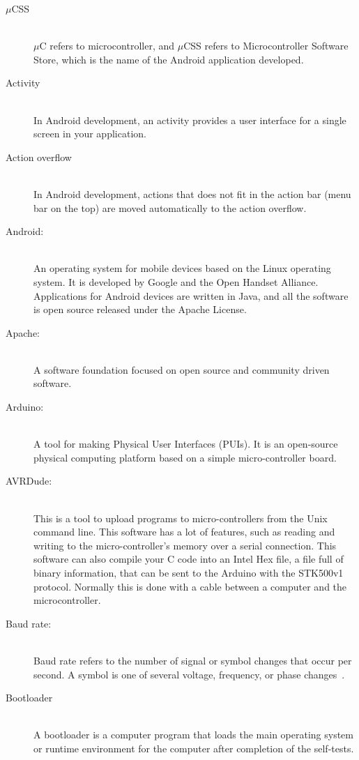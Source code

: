 \begin{description}
	\item[$\mu$CSS] \hfill \\
		$\mu$C refers to microcontroller, and $\mu$CSS refers to Microcontroller Software Store, which is the name of the Android application developed.
	\item[Activity] \hfill \\
		In Android development, an activity provides a user interface for a single screen in your application.
	\item[Action overflow] \hfill \\
		In Android development, actions that does not fit in the action bar (menu bar on the top) are moved automatically to the action overflow.
	\item[Android:]\hfill \\
		An operating system for mobile devices based on the Linux operating system. It is developed by Google and the Open Handset Alliance. Applications for Android devices are written in Java, and all the software is open source released under the Apache License.
	\item[Apache:] \hfill \\
		A software foundation focused on open source and community driven software.
	\item[Arduino:]\hfill \\
		A tool for making Physical User Interfaces (PUIs). It is an open-source physical computing platform based on a simple micro-controller board.
	\item[AVRDude:]\hfill \\
		This is a tool to upload programs to micro-controllers from the Unix command line. This software has a lot of features, such as reading and writing to the micro-controller's memory over a serial connection. This software can also compile your C code into an Intel Hex file, a file full of binary information, that can be sent to the Arduino with the STK500v1 protocol. Normally this is done with a cable between a computer and the microcontroller.
	\item[Baud rate:]\hfill \\
		Baud rate refers to the number of signal or symbol changes that occur per second. A symbol is one of several voltage, frequency, or phase changes~\cite{baudrate}.
	\item[Bootloader] \hfill \\
		A bootloader is a computer program that loads the main operating system or runtime environment for the computer after completion of the self-tests.

\end{description}
